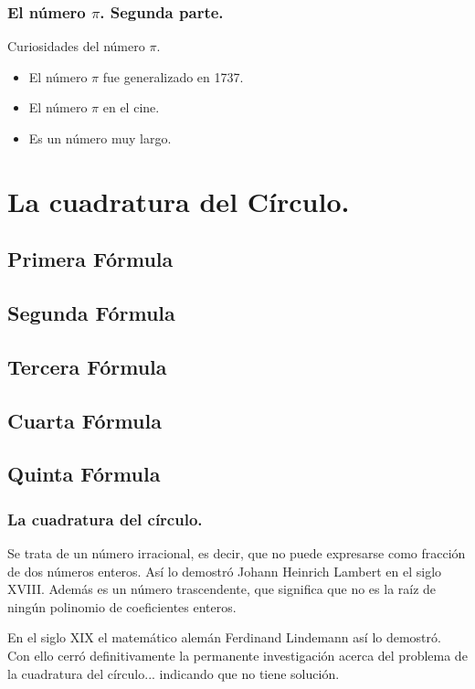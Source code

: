 \documentclass{beamer}
\begin{document}
\begin{frame}

\frametitle{El número $\pi$. Segunda parte.}

\begin{block}{Curiosidades del número $\pi$.}
  \begin{itemize}
  \item
  El número $\pi$ fue generalizado en 1737.
  \pause

  \item
  El número $\pi$ en el cine.
  \pause

  \item
  Es un número muy largo.

  \end{itemize}
\end{block}

\end{frame}

\section{La cuadratura del Círculo.}

\subsection{Primera Fórmula}
\subsection{Segunda Fórmula}
\subsection{Tercera Fórmula}
\subsection{Cuarta Fórmula}
\subsection{Quinta Fórmula}
\begin{frame}
\frametitle{La cuadratura del círculo.}

Se trata de un número irracional, es decir, que no puede expresarse como fracción de dos números enteros. Así lo demostró Johann Heinrich Lambert en el siglo XVIII. Además es un número trascendente, que significa que no es la raíz de ningún polinomio de coeficientes enteros.

En el siglo XIX el matemático alemán Ferdinand Lindemann así lo demostró. Con ello cerró definitivamente la permanente investigación acerca del problema de la cuadratura del círculo... indicando que no tiene solución.

\end{frame}
\end{document}
